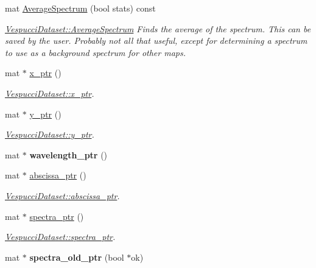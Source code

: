 \begin{DoxyCompactItemize}
mat \hyperlink{class_vespucci_dataset_a3d79228605a2d5ba4eb698b6d86e980e}{Average\+Spectrum} (bool stats) const 
\begin{DoxyCompactList}\small\item\em \hyperlink{class_vespucci_dataset_a3d79228605a2d5ba4eb698b6d86e980e}{Vespucci\+Dataset\+::\+Average\+Spectrum} Finds the average of the spectrum. This can be saved by the user. Probably not all that useful, except for determining a spectrum to use as a background spectrum for other maps. \end{DoxyCompactList}\item 
mat $\ast$ \hyperlink{class_vespucci_dataset_a64ac0dabcee669da58f55ae94bb63bc8}{x\+\_\+ptr} ()
\begin{DoxyCompactList}\small\item\em \hyperlink{class_vespucci_dataset_a64ac0dabcee669da58f55ae94bb63bc8}{Vespucci\+Dataset\+::x\+\_\+ptr}. \end{DoxyCompactList}\item 
mat $\ast$ \hyperlink{class_vespucci_dataset_ae3e3a13a4c77f575a64070765e613759}{y\+\_\+ptr} ()
\begin{DoxyCompactList}\small\item\em \hyperlink{class_vespucci_dataset_ae3e3a13a4c77f575a64070765e613759}{Vespucci\+Dataset\+::y\+\_\+ptr}. \end{DoxyCompactList}\item 
mat $\ast$ {\bfseries wavelength\+\_\+ptr} ()\hypertarget{class_vespucci_dataset_adb13350f6456bb09277e63a8b8d9a001}{}\label{class_vespucci_dataset_adb13350f6456bb09277e63a8b8d9a001}

\item 
mat $\ast$ \hyperlink{class_vespucci_dataset_adfc7d61efd917c90d8f92399b9b9c81b}{abscissa\+\_\+ptr} ()
\begin{DoxyCompactList}\small\item\em \hyperlink{class_vespucci_dataset_adfc7d61efd917c90d8f92399b9b9c81b}{Vespucci\+Dataset\+::abscissa\+\_\+ptr}. \end{DoxyCompactList}\item 
mat $\ast$ \hyperlink{class_vespucci_dataset_ad91edadd2c2a7630929088d0b0c7fc19}{spectra\+\_\+ptr} ()
\begin{DoxyCompactList}\small\item\em \hyperlink{class_vespucci_dataset_ad91edadd2c2a7630929088d0b0c7fc19}{Vespucci\+Dataset\+::spectra\+\_\+ptr}. \end{DoxyCompactList}\item 
mat $\ast$ {\bfseries spectra\+\_\+old\+\_\+ptr} (bool $\ast$ok)\hypertarget{class_vespucci_dataset_a6f71f24af359f3d61f2ecdbcc7cab396}{}\label{class_vespucci_dataset_a6f71f24af359f3d61f2ecdbcc7cab396}


\end{DoxyCompactItemize}
